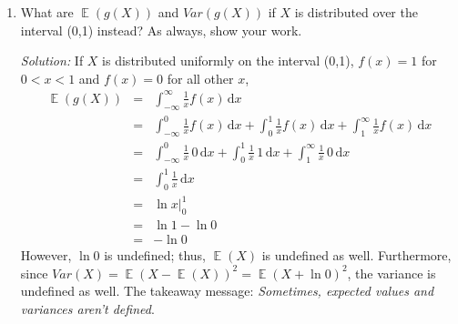 \documentclass[11pt]{article}
\DeclareMathOperator*{\E}{\mathbb{E}}
\begin{document}
\begin{enumerate}
{\it Solution:} Because $X$ is uniformly distributed on the interval (1,2), we know $f(x) = 1$ for $1<x<2$ and $f(x)=0$ for all other $x$. Therefore, since $\E(g(X)) =  \int_{-\infty}^{\infty} \! g(x)f(x) \, dx$,
\begin{eqnarray*}
\E(g(X) &=&  \int_{-\infty}^{\infty} \! \frac{1}{x}f(x) \, \mathrm{d} x \\
&=&  \int_{-\infty}^1 \! \frac{1}{x}f(x) \, \mathrm{d} x +  \int_1^2 \! \frac{1}{x}f(x) \, \mathrm{d} x +  \int_2^{\infty} \! \frac{1}{x}f(x) \, \mathrm{d} x \\
&=&  \int_{-\infty}^1 \! \frac{1}{x} \, 0 \, \mathrm{d} x +  \int_1^2 \! \frac{1}{x} \, 1 \, \mathrm{d} x +  \int_2^{\infty} \! \frac{1}{x} \, 0 \, \mathrm{d} x \\
&=&   \int_1^2 \! \frac{1}{x} \, \mathrm{d} x  \\
&=& \ln x \Bigr|_1^2 \\
&=& \ln 2 - \ln 1 \\
&=& \ln 2 - 0 \\
&\approx & .693\\
\\
Var(g(X)) &=& \E(X^2)-\E(X)^2 \\
&=& \E(X^2) - (\ln 2)^2 \\
&=& \int_1^2 \! \frac{1}{x^2} \, 1 \, \mathrm{d} x - (\ln 2)^2\\
&=& -\frac{1}{x} \Bigr|_1^2 - (\ln 2)^2 \\
&=& -\frac{1}{2} - (-1) - (\ln2)^2 \\
&=& \frac{1}{2} - (\ln2)^2 \\
&\approx & .0195
\end{eqnarray*} 

\pagebreak
\item What are  $\E(g(X))$ and $Var(g(X))$ if $X$ is distributed over the interval (0,1) instead? As always, show your work.

{\it Solution:} If $X$ is distributed uniformly on the interval (0,1),  $f(x) = 1$ for $0<x<1$ and $f(x)=0$ for all other $x$,
\begin{eqnarray*}
\E(g(X)) &=&  \int_{-\infty}^{\infty} \! \frac{1}{x}f(x) \, \mathrm{d} x \\
&=&  \int_{-\infty}^0 \! \frac{1}{x}f(x) \, \mathrm{d} x +  \int_0^1 \! \frac{1}{x}f(x) \, \mathrm{d} x +  \int_1^{\infty} \! \frac{1}{x}f(x) \, \mathrm{d} x \\
&=&  \int_{-\infty}^0 \! \frac{1}{x} \, 0 \, \mathrm{d} x +  \int_0^1 \! \frac{1}{x} \, 1 \, \mathrm{d} x +  \int_1^{\infty} \! \frac{1}{x} \, 0 \, \mathrm{d} x \\
&=&   \int_0^1 \! \frac{1}{x} \, \mathrm{d} x  \\
&=& \ln x \Bigr|_0^1 \\
&=& \ln 1 - \ln 0 \\
&=& -\ln 0
\end{eqnarray*}
However, $\ln 0$ is undefined; thus, $\E(X)$ is undefined as well. Furthermore, since $Var(X) = \E(X-\E(X))^2 = \E(X+\ln 0)^2$, the variance is undefined as well. The takeaway message: \textit{Sometimes, expected values and variances aren't defined}.

\end{enumerate}
\pagebreak
\end{document}
